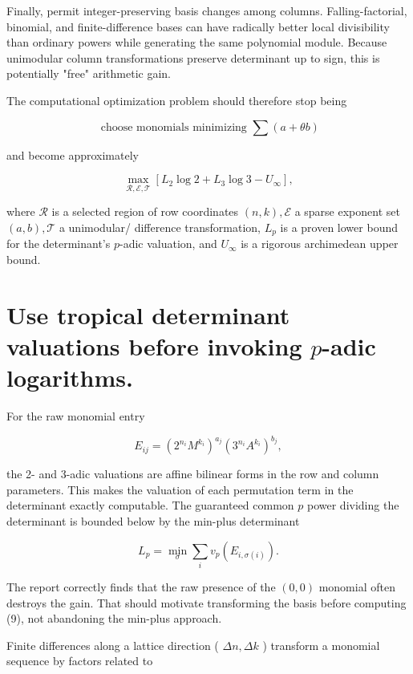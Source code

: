 \documentclass[10pt]{article}
\begin{document}
Finally, permit integer-preserving basis changes among columns. Falling-factorial, binomial, and finite-difference bases can have radically better local divisibility than ordinary powers while generating the same polynomial module. Because unimodular column transformations preserve determinant up to sign, this is potentially "free" arithmetic gain.

The computational optimization problem should therefore stop being

$$
\text { choose monomials minimizing } \sum(a+\theta b)
$$

and become approximately


\begin{equation*}
\max _{\mathcal{R}, \mathcal{E}, \mathcal{T}}\left[L_{2} \log 2+L_{3} \log 3-U_{\infty}\right], \tag{8}
\end{equation*}


where $\mathcal{R}$ is a selected region of row coordinates $(n, k), \mathcal{E}$ a sparse exponent set $(a, b), \mathcal{T}$ a unimodular/ difference transformation, $L_{p}$ is a proven lower bound for the determinant's $p$-adic valuation, and $U_{\infty}$ is a rigorous archimedean upper bound.

\section*{Use tropical determinant valuations before invoking $p$-adic logarithms.}
For the raw monomial entry

$$
E_{i j}=\left(2^{n_{i}} M^{k_{i}}\right)^{a_{j}}\left(3^{n_{i}} A^{k_{i}}\right)^{b_{j}},
$$

the 2- and 3-adic valuations are affine bilinear forms in the row and column parameters. This makes the valuation of each permutation term in the determinant exactly computable. The guaranteed common $p$ power dividing the determinant is bounded below by the min-plus determinant


\begin{equation*}
L_{p}=\min _{\sigma} \sum_{i} v_{p}\left(E_{i, \sigma(i)}\right) . \tag{9}
\end{equation*}


The report correctly finds that the raw presence of the $(0,0)$ monomial often destroys the gain. That should motivate transforming the basis before computing (9), not abandoning the min-plus approach.

Finite differences along a lattice direction ( $\Delta n, \Delta k$ ) transform a monomial sequence by factors related to
\end{document}
